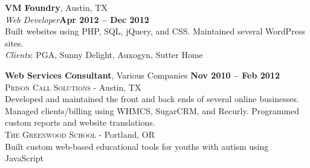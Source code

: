 \documentclass[margin,line]{resume}
\begin{document}
\begin{resume}
\textbf{VM Foundry}, Austin, TX
\vspace{2mm}\\
\textsl{Web Developer}\hfill \textbf{Apr 2012 -- Dec 2012}\vspace{1mm}\\
Built websites using PHP, SQL, jQuery, and CSS. Maintained several WordPress sites.\vspace{1mm}\\
\textsl{Clients}: {\small PGA, Sunny Delight, Auxogyn, Sutter Home}

\textbf{Web Services Consultant}, Various Companies \hfill \textbf{Nov 2010 -- Feb 2012}\vspace{2mm}\\
\textsc{Prison Call Solutions} - Austin, TX\vspace{1mm}\\%
Developed and maintained the front and back ends of several online businesses. Managed clients/billing using WHMCS, SugarCRM, and Recurly. Programmed custom reports and website translations.
\vspace{2mm}\\
\textsc{The Greenwood School} - Portland, OR\vspace{1mm}\\%
Built custom web-based educational tools for youths with autism using JavaScript

\end{resume}
\end{document}
